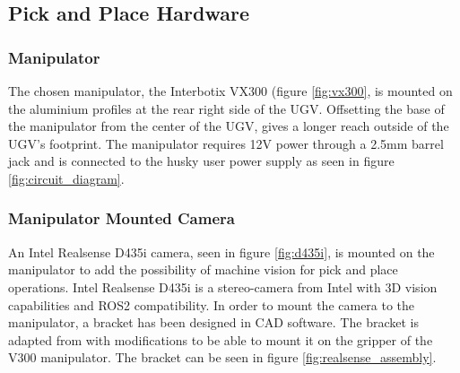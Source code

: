 \subsection{Pick and Place Hardware}

\subsubsection{Manipulator}
The chosen manipulator, the Interbotix VX300 (figure \ref{fig:vx300}, is mounted on the aluminium profiles at the rear right side of the UGV. Offsetting the base of the manipulator from the center of the UGV, gives a longer reach outside of the UGV's footprint. The manipulator requires 12V power through a 2.5mm barrel jack and is connected to the husky user power supply as seen in figure \ref{fig:circuit_diagram}.

\subsubsection{Manipulator Mounted Camera}
An Intel Realsense D435i camera, seen in figure \ref{fig:d435i}, is mounted on the manipulator to add the possibility of machine vision for pick and place operations. Intel Realsense D435i is a stereo-camera from Intel with 3D vision capabilities and ROS2 compatibility. In order to mount the camera to the manipulator, a bracket has been  designed in CAD software. The bracket is adapted from \cite{d435_sleeve} with modifications to be able to mount it on the gripper of the V300 manipulator. The bracket can be seen in figure \ref{fig:realsense_assembly}.

